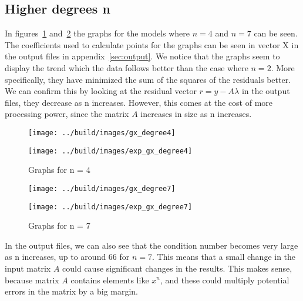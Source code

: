 \documentclass[11pt, a4paper, titlepage, openright]{article}
\begin{document}
    \subsection{Higher degrees n}
    \label{sec:higherdegrees}
    In figures~\ref{fig:n4} and~\ref{fig:n7} the graphs for the models where \(n=4\) and \(n=7\) can be seen. The coefficients used to calculate points for 
    the graphs can be seen in vector X in the output files in appendix~\ref{sec:output}. We notice that the graphs seem to display
    the trend which the data follows better than the case where \(n=2\). More specifically, they have minimized the sum of the squares
    of the residuals better. We can confirm this by looking at the residual vector \(r = y - A\lambda\) in the output files,
    they decrease as n increases.
    However, this comes at the cost of more processing power, since the matrix \(A\) increases in size as n increases.
    \newpage
    \begin{figure}[H]
        \begin{minipage}[b]{0.49\textwidth}
            \texttt{[image: ../build/images/gx\_degree4]}
        \end{minipage}
        \hfill
        \begin{minipage}[b]{0.49\textwidth}
            \texttt{[image: ../build/images/exp\_gx\_degree4]}
        \end{minipage}
        \caption{Graphs for n = 4}
        \label{fig:n4}
    \end{figure}
    
    \begin{figure}[H]
        \begin{minipage}[b]{0.49\textwidth}
            \texttt{[image: ../build/images/gx\_degree7]}
        \end{minipage}
        \hfill
        \begin{minipage}[b]{0.49\textwidth}
            \texttt{[image: ../build/images/exp\_gx\_degree7]}
        \end{minipage}
        \caption{Graphs for n = 7}
        \label{fig:n7}
    \end{figure}
    In the output files, we can also see that the condition number becomes very large as n increases, up to around 6\mbox{}6 for \(n = 7\). 
    This means that a small change in the input matrix \(A\) could cause significant changes in the results. This makes sense, because matrix \(A\) 
    contains elements like \(x^n\), and these could multiply potential errors in the matrix by a big margin.
    
\end{document}
